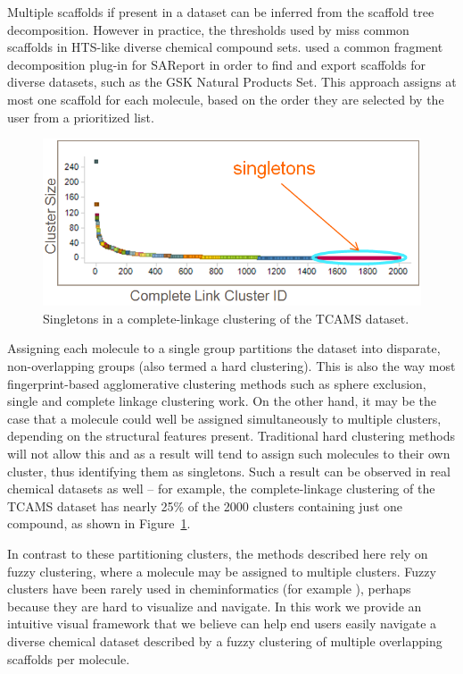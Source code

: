 \documentclass[journal=jacsat,manuscript=article]{achemso}
\newcommand*\fref[1]{Figure~\ref{fig:#1}}
\begin{document}
Multiple scaffolds if present in a dataset can be inferred from the
scaffold tree decomposition\cite{ClarkLabute2008SAReport}. However in
practice, the thresholds used by \citeauthor{ClarkLabute2008SAReport}
miss common scaffolds in HTS-like diverse chemical compound
sets. \citeauthor{Bandyopadhyay2012ACS} used a common fragment
decomposition plug-in for SAReport in order to find and export
scaffolds for diverse datasets, such as the GSK Natural Products
Set\cite{Coma2014}.  This approach assigns at most one scaffold for
each molecule, based on the order they are selected by the user from a
prioritized list.

\begin{figure}
\includegraphics[width=5.5in]{fig/singletons.png}
\caption{Singletons in a complete-linkage clustering of the TCAMS dataset.}
\label{fig:platypus}
\end{figure}

Assigning each molecule to a single group partitions the dataset into
disparate, non-overlapping groups (also termed a hard clustering).
This is also the way most fingerprint-based agglomerative clustering
methods such as sphere exclusion, single and complete linkage
clustering work\cite{Downs2003}. On the other hand, it may be the case
that a molecule could well be assigned simultaneously to multiple
clusters, depending on the structural features present. Traditional
hard clustering methods will not allow this and as a result will tend
to assign such molecules to their own cluster, thus identifying them
as singletons.  Such a result can be observed in real chemical datasets
as well -- for example, the complete-linkage clustering of the TCAMS
dataset\cite{Gamo2010,Calderon2011} has nearly 25\% of the 2000
clusters containing just one compound, as shown in \fref{platypus}.

In contrast to these partitioning clusters, the methods described
here rely on fuzzy clustering, where a molecule may be assigned to
multiple clusters. Fuzzy clusters have been rarely used in
cheminformatics (for example \cite{Holliday2004,Richmond2013Galois}),
perhaps because they are hard to visualize and navigate.  In this work
we provide an intuitive visual framework that we believe can help end
users easily navigate a diverse chemical dataset described by a fuzzy
clustering of multiple overlapping scaffolds per molecule.
\end{document}

